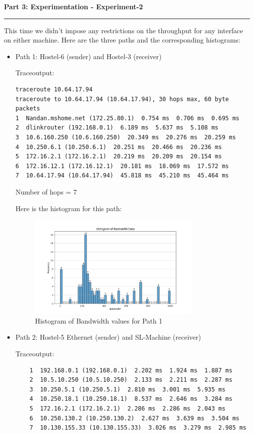 \documentclass[a4paper,12pt]{article}
\newenvironment{solution}[2][]{%
    \begin{mdframed}[linecolor=blue!70!black, linewidth=2pt, roundcorner=10pt, backgroundcolor=yellow!10!white, skipabove=12pt, skipbelow=12pt]%
        \textbf{\large #2}
        \par\noindent\rule{\textwidth}{0.4pt}
}{
    \end{mdframed}
}
\begin{document}
\begin{solution}{Part 3: Experimentation - Experiment-2}
    This time we didn't impose any restrictions on the throughput for any interface on either machine. Here are the three paths and the corresponding histograms:
    \begin{itemize}
        \item Path 1: Hostel-6 (sender) and Hostel-3 (receiver)
        
        Traceoutput:
        \begin{verbatim}
traceroute 10.64.17.94
traceroute to 10.64.17.94 (10.64.17.94), 30 hops max, 60 byte packets
1  Nandan.mshome.net (172.25.80.1)  0.754 ms  0.706 ms  0.695 ms
2  dlinkrouter (192.168.0.1)  6.189 ms  5.637 ms  5.108 ms
3  10.6.160.250 (10.6.160.250)  20.349 ms  20.276 ms  20.259 ms
4  10.250.6.1 (10.250.6.1)  20.251 ms  20.466 ms  20.236 ms
5  172.16.2.1 (172.16.2.1)  20.219 ms  20.209 ms  20.154 ms
6  172.16.12.1 (172.16.12.1)  20.181 ms  18.069 ms  17.572 ms
7  10.64.17.94 (10.64.17.94)  45.818 ms  45.210 ms  45.464 ms
        \end{verbatim}
        Number of hops = 7

        Here is the histogram for this path:
        \begin{figure}[H]
            \centering
            \includegraphics[width=0.8\textwidth]{histograms/h6-h3-buffer_bandwidth_histogram.png}
            \caption{Histogram of Bandwidth values for Path 1}
        \end{figure}

        \item Path 2: Hostel-5 Ethernet (sender) and SL-Machine (receiver)
        
        Traceoutput:
\begin{verbatim}
    1  192.168.0.1 (192.168.0.1)  2.202 ms  1.924 ms  1.887 ms
    2  10.5.10.250 (10.5.10.250)  2.133 ms  2.211 ms  2.287 ms
    3  10.250.5.1 (10.250.5.1)  2.810 ms  3.001 ms  5.935 ms
    4  10.250.18.1 (10.250.18.1)  8.537 ms  2.646 ms  3.284 ms
    5  172.16.2.1 (172.16.2.1)  2.286 ms  2.286 ms  2.043 ms
    6  10.250.130.2 (10.250.130.2)  2.627 ms  3.639 ms  3.504 ms
    7  10.130.155.33 (10.130.155.33)  3.026 ms  3.279 ms  2.985 ms
\end{verbatim}


\end{itemize}
\end{solution}
\end{document}
